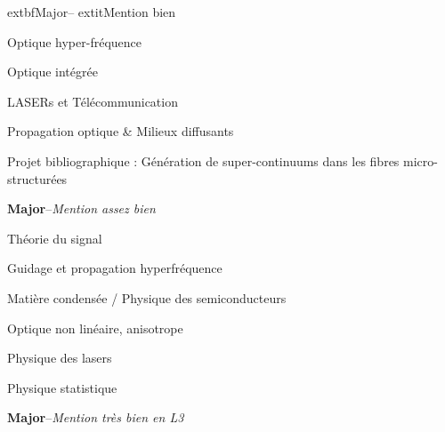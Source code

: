 \documentclass[9pt,a4paper,academicons]{altacv}
\begin{document}
\newpage
\begin{fullwidth}

	extbf{Major}--	extit{Mention bien}
\begin{cvlistdescription}
    \item Optique hyper-fréquence
    \item Optique intégrée
    \item LASERs et Télécommunication
    \item Propagation optique \& Milieux diffusants
    \item Projet bibliographique : Génération de super-continuums dans les fibres micro-structurées
\end{cvlistdescription}

\divider

\textbf{Major}--\textit{Mention assez bien}
\begin{cvlistdescription}
    \item Théorie du signal
    \item Guidage et propagation hyperfréquence
    \item Matière condensée / Physique des semiconducteurs
    \item Optique non linéaire, anisotrope
    \item Physique des lasers
    \item Physique statistique
\end{cvlistdescription}
\divider

\textbf{Major}--\textit{Mention très bien en L3}






\end{fullwidth}
\end{document}
